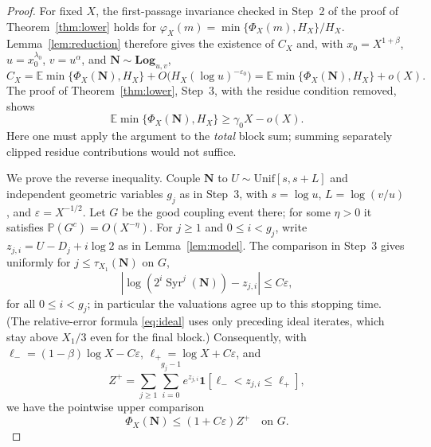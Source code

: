 \documentclass[12pt]{amsart}
\theoremstyle{definition}
\theoremstyle{remark}
\begin{document}
\begin{proof}
For fixed $X$, the first-passage invariance checked in Step~2 of
the proof of Theorem~\ref{thm:lower} holds for
$\varphi_X(m)=\min\{\Phi_X(m),H_X\}/H_X$.
Lemma~\ref{lem:reduction} therefore gives the existence of $C_X$
and, with $x_0=X^{1+\beta}$, $u=x_0^{\lambda_0}$,
$v=u^\alpha$, and $\mathbf N\sim\mathbf{Log}_{u,v}$,
\begin{equation}\label{eq:calib-window}
 C_X=\mathbb E\min\{\Phi_X(\mathbf N),H_X\}
  +O\bigl(H_X(\log u)^{-\varepsilon_0}\bigr)
 =\mathbb E\min\{\Phi_X(\mathbf N),H_X\}+o(X).
\end{equation}
The proof of Theorem~\ref{thm:lower}, Step~3, with the residue
condition removed, shows
\begin{equation}\label{eq:calib-lower}
 \mathbb E\min\{\Phi_X(\mathbf N),H_X\}\ge\gamma_0X-o(X).
\end{equation}
Here one must apply the argument to the \emph{total} block sum;
summing separately clipped residue contributions would not suffice.

We prove the reverse inequality. Couple $\mathbf N$ to
$U\sim\mathrm{Unif}[s,s+L]$ and independent geometric variables
$g_j$ as in Step~3, with $s=\log u$, $L=\log(v/u)$, and
$\varepsilon=X^{-1/2}$. Let $G$ be the good coupling event there;
for some $\eta>0$ it satisfies $\mathbb P(G^c)=O(X^{-\eta})$.
For $j\ge1$ and $0\le i<g_j$, write
$z_{j,i}=U-D_j+i\log2$ as in Lemma~\ref{lem:model}.
The comparison in Step~3 gives uniformly for
$j\le\tau_{X_1}(\mathbf N)$ on $G$,
\[
 \left|\log(2^i\operatorname{Syr}^j(\mathbf N))-z_{j,i}\right|
 \le C\varepsilon,
\]
for all $0\le i<g_j$; in particular the valuations agree up to
this stopping time. (The relative-error formula
\eqref{eq:ideal} uses only preceding ideal iterates, which stay
above $X_1/3$ even for the final block.) Consequently, with
$\ell_-=(1-\beta)\log X-C\varepsilon$,
$\ell_+=\log X+C\varepsilon$, and
\[
 Z^+=\sum_{j\ge1}\sum_{i=0}^{g_j-1}e^{z_{j,i}}
       \mathbf 1[\ell_-<z_{j,i}\le\ell_+],
\]
we have the pointwise upper comparison
\begin{equation}\label{eq:calib-upper-coupling}
 \Phi_X(\mathbf N)\le (1+C\varepsilon)Z^+\quad\text{on }G.
\end{equation}


\end{proof}
\end{document}
